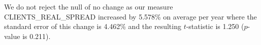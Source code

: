 We do not reject the null of no change as our measure CLIENTS\_REAL\_SPREAD increased by 5.578\% on average per year where the standard error of this change is 4.462\% and the resulting $t$-statistic is 1.250 ($p$-value is 0.211).